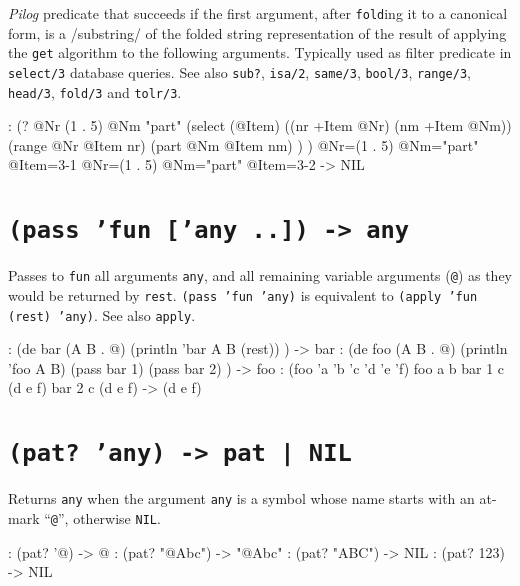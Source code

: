 \emph{Pilog} predicate that succeeds if the first argument,
after \texttt{fold}ing it to a canonical form, is a /substring/ of the folded string representation of the result of applying the \texttt{get} algorithm to
the following arguments. Typically used as filter predicate in
\texttt{select/3} database queries. See also \texttt{sub?}, \texttt{isa/2}, \texttt{same/3},
\texttt{bool/3}, \texttt{range/3}, \texttt{head/3}, \texttt{fold/3} and \texttt{tolr/3}.


\begin{wideverbatim}
: (?
   @Nr (1 . 5)
   @Nm "part"
   (select (@Item)
      ((nr +Item @Nr) (nm +Item @Nm))
      (range @Nr @Item nr)
      (part @Nm @Item nm) ) )
 @Nr=(1 . 5) @Nm="part" @Item={3-1}                                              @Nr=(1 . 5) @Nm="part" @Item={3-2}
-> NIL
\end{wideverbatim}

 
\section*{\texttt{(pass 'fun ['any ..]) -> any}}
\label{sec:func-ref-P-(pass 'fun ['any ..]) -> any}


Passes to \texttt{fun} all arguments \texttt{any}, and all remaining variable
arguments (\texttt{@}) as they would be returned by \texttt{rest}. \texttt{(pass 'fun 'any)}
is equivalent to \texttt{(apply 'fun (rest) 'any)}. See also \texttt{apply}.


\begin{wideverbatim}
: (de bar (A B . @)
   (println 'bar A B (rest)) )
-> bar
: (de foo (A B . @)
   (println 'foo A B)
   (pass bar 1)
   (pass bar 2) )
-> foo
: (foo 'a 'b 'c 'd 'e 'f)
foo a b
bar 1 c (d e f)
bar 2 c (d e f)
-> (d e f)
\end{wideverbatim}

 
\section*{\texttt{(pat? 'any) -> pat | NIL}}
\label{sec:func-ref-P-(pat? 'any) -> pat | NIL}


Returns \texttt{any} when the argument \texttt{any} is a symbol whose name starts with
an at-mark ``\texttt{@}'', otherwise \texttt{NIL}.


\begin{wideverbatim}
: (pat? '@)
-> @
: (pat? "@Abc")
-> "@Abc"
: (pat? "ABC")
-> NIL
: (pat? 123)
-> NIL
\end{wideverbatim}

